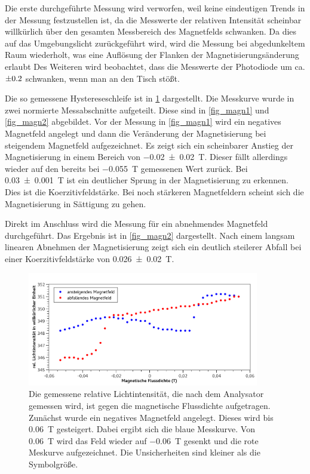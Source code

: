 \documentclass[
	a4paper,
	12pt,
	pagesize,
	ngerman
]{scrartcl}
\begin{document}
	Die erste durchgeführte Messung wird verworfen, weil keine eindeutigen Trends in der Messung festzustellen ist, da die Messwerte der relativen Intensität scheinbar willkürlich über den gesamten Messbereich des Magnetfelds schwanken.
	Da dies auf das Umgebungslicht zurückgeführt wird, wird die Messung bei abgedunkeltem Raum wiederholt, was eine Auflösung der Flanken der Magnetisierungsänderung erlaubt
	Des Weiteren wird beobachtet, dass die Messwerte der Photodiode um ca. $\SI{\pm0,2}{}$ schwanken, wenn man an den Tisch stößt.

	Die so gemessene Hystereseschleife ist in \cref{fig_magn_licht} dargestellt.
	Die Messkurve wurde in zwei normierte Messabschnitte aufgeteilt.
	Diese sind in \cref{fig_magn1} und \cref{fig_magn2} abgebildet.
	Vor der Messung in \cref{fig_magn1} wird ein negatives Magnetfeld angelegt und dann die Veränderung der Magnetisierung bei steigendem Magnetfeld aufgezeichnet.
	Es zeigt sich ein scheinbarer Anstieg der Magnetisierung in einem Bereich von \SI{-0,02+-0,02}{T}. 
	Dieser fällt allerdings wieder auf den bereits bei \SI{-0,055}{T} gemessenen Wert zurück.
	Bei \SI{0,03+-0,001}{T} ist ein deutlicher Sprung in der Magnetisierung zu erkennen. 
	Dies ist die Koerzitivfeldstärke. 
	Bei noch stärkeren Magnetfeldern scheint sich die Magnetisierung in Sättigung zu gehen.

	Direkt im Anschluss wird die Messung für ein abnehmendes Magnetfeld durchgeführt.
	Das Ergebnis ist in \cref{fig_magn2} dargestellt.
	Nach einem langsam linearen Abnehmen der Magnetisierung zeigt sich ein deutlich steilerer Abfall bei einer Koerzitivfeldstärke von \SI{0,026+-0,02}{T}.
	
	
	\begin{figure}[H] 
		\includegraphics[width=0.90\textwidth]{fig_magn_licht} %
		\centering
		\caption{Die gemessene relative Lichtintensität, die nach dem Analysator gemessen wird, ist gegen die magnetische Flussdichte aufgetragen. 
		Zunächst wurde ein negatives Magnetfeld angelegt. 
		Dieses wird bis \SI{0,06}{T} gesteigert.
		Dabei ergibt sich die blaue Messkurve.
		Von \SI{0,06}{T} wird das Feld wieder auf \SI{-0,06}{T} gesenkt und die rote Meskurve aufgezeichnet.
		Die Unsicherheiten sind kleiner als die Symbolgröße.} %
		\label{fig_magn_licht}
		\centering
	\end{figure}
\end{document}
